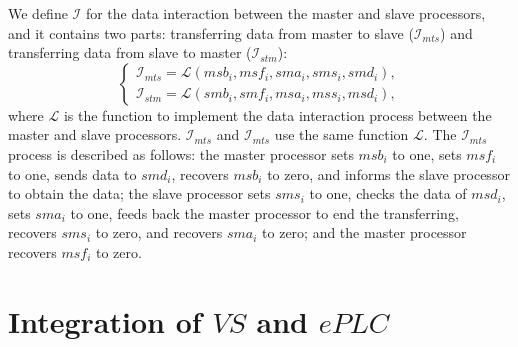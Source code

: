 \documentclass[journal,UTF8]{IEEEtran}
\begin{document}
	We define $\mathcal{I}$ for the data interaction between the master and slave processors, and it contains two parts: transferring data from master to slave ($\mathcal{I}_{mts}$) and transferring data from slave to master ($\mathcal{I}_{stm}$):
	\begin{equation}
	\left\{
	\begin{array}{l}
	\mathcal{I}_{mts} = \mathcal{L} (msb_i,msf_i,sma_i,sms_i,smd_i),\\
	\mathcal{I}_{stm} = \mathcal{L} (smb_i,smf_i,msa_i,mss_i,msd_i),
	\end{array}
	\right.
	\end{equation}
	where $\mathcal{L}$ is the function to implement the data interaction process between the master and slave processors. $\mathcal{I}_{mts}$ and $\mathcal{I}_{mts}$ use the same function $\mathcal{L}$. The $\mathcal{I}_{mts}$ process is described as follows: the master processor sets $msb_i$ to one, sets $msf_i$ to one, sends data to $smd_i$, recovers $msb_i$ to zero, and informs the slave processor to obtain the data; the slave processor sets $sms_i$ to one, checks the data of $msd_i$, sets $sma_i$ to one, feeds back the master processor to end the transferring, recovers $sms_i$ to zero, and recovers $sma_i$ to zero; and the master processor recovers $msf_i$ to zero. 
	
	
	\section{Integration of $VS$ and $ePLC$}
	\label{Integration}
	
\end{document}
